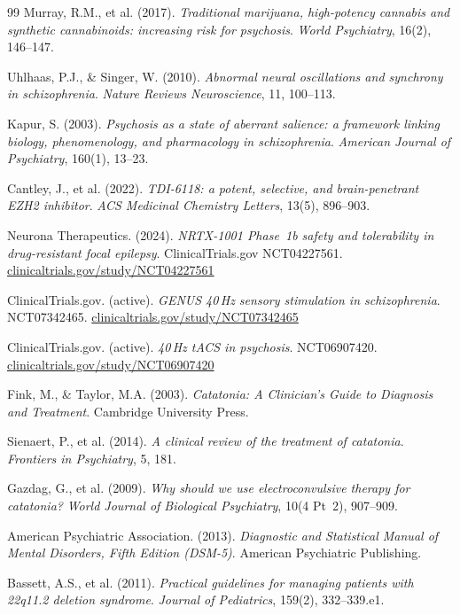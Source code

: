 \documentclass[12pt,a4paper]{article}
\begin{document}
\begin{thebibliography}{99}
Murray, R.M., et al. (2017).
\textit{Traditional marijuana, high-potency cannabis and
synthetic cannabinoids: increasing risk for psychosis}.
\textit{World Psychiatry}, 16(2), 146--147.

Uhlhaas, P.J., \& Singer, W. (2010).
\textit{Abnormal neural oscillations and synchrony in
schizophrenia}.
\textit{Nature Reviews Neuroscience}, 11, 100--113.

Kapur, S. (2003).
\textit{Psychosis as a state of aberrant salience: a
framework linking biology, phenomenology, and
pharmacology in schizophrenia}.
\textit{American Journal of Psychiatry}, 160(1), 13--23.

Cantley, J., et al. (2022).
\textit{TDI-6118: a potent, selective, and brain-penetrant
EZH2 inhibitor}.
\textit{ACS Medicinal Chemistry Letters}, 13(5), 896--903.

Neurona Therapeutics. (2024).
\textit{NRTX-1001 Phase~1b safety and tolerability in
drug-resistant focal epilepsy}.
ClinicalTrials.gov NCT04227561.
\href{https://clinicaltrials.gov/study/NCT04227561}
{clinicaltrials.gov/study/NCT04227561}

ClinicalTrials.gov. (active).
\textit{GENUS 40\,Hz sensory stimulation in schizophrenia}.
NCT07342465.
\href{https://clinicaltrials.gov/study/NCT07342465}
{clinicaltrials.gov/study/NCT07342465}

ClinicalTrials.gov. (active).
\textit{40\,Hz tACS in psychosis}.
NCT06907420.
\href{https://clinicaltrials.gov/study/NCT06907420}
{clinicaltrials.gov/study/NCT06907420}

Fink, M., \& Taylor, M.A. (2003).
\textit{Catatonia: A Clinician's Guide to Diagnosis and
Treatment}. Cambridge University Press.

Sienaert, P., et al. (2014).
\textit{A clinical review of the treatment of catatonia}.
\textit{Frontiers in Psychiatry}, 5, 181.

Gazdag, G., et al. (2009).
\textit{Why should we use electroconvulsive therapy for
catatonia?}
\textit{World Journal of Biological Psychiatry}, 10(4
Pt~2), 907--909.

American Psychiatric Association. (2013).
\textit{Diagnostic and Statistical Manual of Mental
Disorders, Fifth Edition (DSM-5)}.
American Psychiatric Publishing.

Bassett, A.S., et al. (2011).
\textit{Practical guidelines for managing patients with
22q11.2 deletion syndrome}.
\textit{Journal of Pediatrics}, 159(2), 332--339.e1.


\end{thebibliography}
\end{document}
